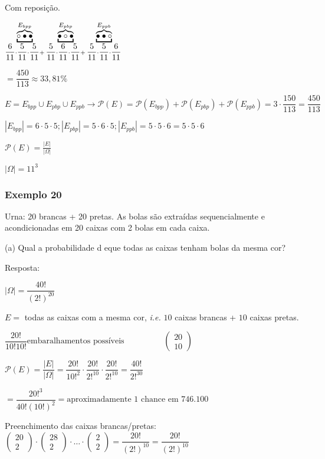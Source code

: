 \documentclass{article}
\begin{document}
	\noindent Com reposição.
	
	$ \underbracket{\overbrace{\circ \bullet \bullet}}^\text{$ E_{bpp} $}_{\dfrac{6}{11} \cdot \dfrac{5}{11} \cdot \dfrac{5}{11}+} \underbracket{\overbrace{\bullet \circ \bullet}}^\text{$ E_{pbp} $}_{\dfrac{5}{11} \cdot \dfrac{6}{11} \cdot \dfrac{5}{11}+} \underbracket{\overbrace{\bullet \bullet \circ}}^\text{$ E_{ppb} $}_{\dfrac{5}{11} \cdot \dfrac{5}{11} \cdot \dfrac{6}{11}} $
	
	$ = \dfrac{450}{113} \approx 33,81\% $
	
	$ E = E_{bpp} \cup E_{pbp} \cup E_{ppb} \rightarrow \mathcal{P}(E) = \mathcal{P}(E_{bpp}) + \mathcal{P}(E_{pbp}) + \mathcal{P}(E_{ppb}) = 3 \cdot \dfrac{150}{113} = \dfrac{450}{113} $
	
	$ |E_{bpp}| = 6 \cdot 5 \cdot 5; |E_{pbp}| = 5 \cdot 6 \cdot 5; |E_{ppb}| = 5 \cdot 5 \cdot 6 = 5 \cdot 5 \cdot 6 $ 
	
	$ \mathcal{P}(E) = \frac{|E|}{|\varOmega|} $
	
	$ |\varOmega| = 11^{3} $
	
	\subsubsection{Exemplo 20}
	
	\noindent Urna: 20 brancas + 20 pretas. As bolas são extraídas sequencialmente e acondicionadas em 20 caixas com 2 bolas em cada caixa.
	
	\noindent (a) Qual a probabilidade d eque todas as caixas tenham bolas da mesma cor?
	
	Resposta:
	
	$ |\varOmega| = \dfrac{40!}{(2!)^{20}} $
	
	$E =$ todas as caixas com a mesma cor, \textit{i.e.} $10$ caixas brancas + $10$ caixas pretas.
	
	$ \dfrac{20!}{10! 10!} \text{embaralhamentos possíveis} \hspace{2cm} \begin{pmatrix}
	20  \\
	10
	\end{pmatrix} $
	
	$ \mathcal{P}(E) = \dfrac{|E|}{|\varOmega|} = \dfrac{20!}{10!^{2}} \cdot \dfrac{20!}{2!^{10}} \cdot \dfrac{20!}{2!^{10}} = \dfrac{40!}{2!^{30}} $
	
	$ = \dfrac{20!^{3}}{40!(10!)^{2}} = \text{aproximadamente $1$ chance em $746.100$} $
	
	Preenchimento das caixas brancas/pretas: $ \begin{pmatrix}
	20  \\
	2
	\end{pmatrix} \cdot \begin{pmatrix}
	28  \\
	2
	\end{pmatrix} \cdot \dots \cdot \begin{pmatrix}
	2  \\
	2
	\end{pmatrix} = \dfrac{20!}{(2!)^{10}} = \dfrac{20!}{(2!)^{10}} $
	
\end{document}

